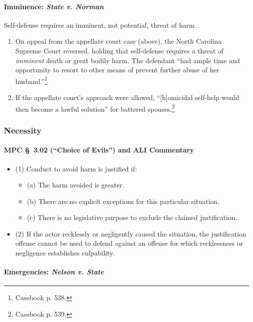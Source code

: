 \paragraph{Imminence: \emph{State v. Norman}}

Self-defense requires an imminent, not potential, threat of harm.

\begin{enumerate}
     \item On appeal from the appellate court case (above), the North Carolina 
     Supreme Court reversed, holding that self-defense requires a threat of 
     \emph{imminent} death or great bodily harm. The defendant ``had ample 
     time and opportunity to resort to other means of prevent further abuse of 
     her husband.''\footnote{Casebook p. 538.}
     \item If the appellate court's approach were allowed, ``[h]omicidal 
     self-help would then become a lawful solution'' for battered 
     spouses.\footnote{Casebook p. 539.}
\end{enumerate}

\subsubsection{Necessity}

\paragraph{MPC \S\ 3.02 (``Choice of Evils'') and ALI Commentary}

\begin{itemize}
    \item (1) Conduct to avoid harm is justified if:
    \begin{itemize}
        \item (a) The harm avoided is greater.
        \item (b) There are no explicit exceptions for this particular 
        situation.
        \item (c) There is no legislative purpose to exclude the claimed 
        justification.
    \end{itemize}
    \item (2) If the actor recklessly or negligently caused the situation, the 
    justification offense cannot be used to defend against an offense for 
    which recklessness or negligence establishes culpability.
\end{itemize}

\paragraph{Emergencies: \emph{Nelson v. State}}

